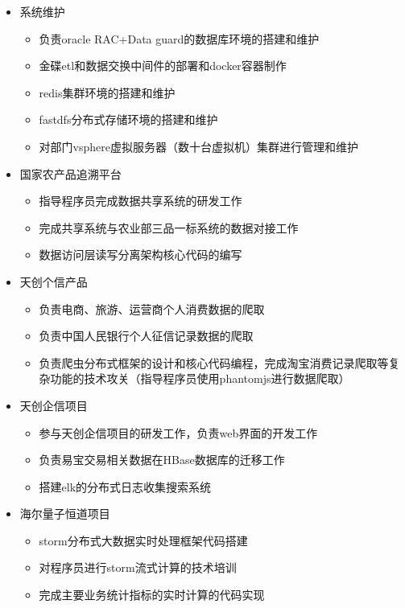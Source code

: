\documentclass{resume}
\begin{document}
\begin{itemize}
  \item 系统维护
  \begin{itemize}
    \item 负责oracle RAC+Data guard的数据库环境的搭建和维护
    \item 金碟etl和数据交换中间件的部署和docker容器制作
    \item redis集群环境的搭建和维护
    \item fastdfs分布式存储环境的搭建和维护
    \item 对部门vsphere虚拟服务器（数十台虚拟机）集群进行管理和维护
  \end{itemize}
  \item 国家农产品追溯平台
  \begin{itemize}
    \item 指导程序员完成数据共享系统的研发工作
    \item 完成共享系统与农业部三品一标系统的数据对接工作
    \item 数据访问层读写分离架构核心代码的编写
  \end{itemize}
\end{itemize}

\begin{itemize}
  \item 天创个信产品
  \begin{itemize}
    \item 负责电商、旅游、运营商个人消费数据的爬取
    \item 负责中国人民银行个人征信记录数据的爬取
    \item 负责爬虫分布式框架的设计和核心代码编程，完成淘宝消费记录爬取等复杂功能的技术攻关（指导程序员使用phantomjs进行数据爬取）
  \end{itemize}
  \item 天创企信项目
  \begin{itemize}
    \item 参与天创企信项目的研发工作，负责web界面的开发工作
    \item 负责易宝交易相关数据在HBase数据库的迁移工作
    \item 搭建elk的分布式日志收集搜索系统
  \end{itemize}
\end{itemize}

\begin{itemize}
  \item 海尔量子恒道项目
  \begin{itemize}
    \item storm分布式大数据实时处理框架代码搭建
    \item 对程序员进行storm流式计算的技术培训
    \item 完成主要业务统计指标的实时计算的代码实现
  \end{itemize}
\end{itemize}
\end{document}

